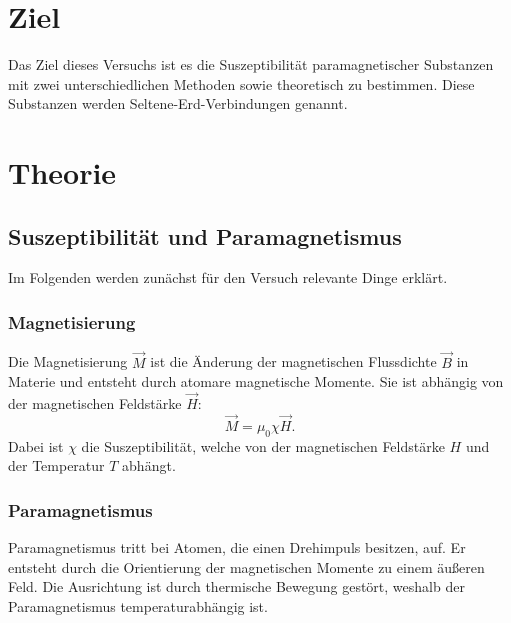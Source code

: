 \section{Ziel}
Das Ziel dieses Versuchs ist es die Suszeptibilität paramagnetischer Substanzen mit
zwei unterschiedlichen Methoden sowie theoretisch zu bestimmen.
Diese Substanzen werden Seltene-Erd-Verbindungen genannt. 

\section{Theorie}
\label{sec:Theorie}


\subsection{Suszeptibilität und Paramagnetismus} %
Im Folgenden werden zunächst für den Versuch relevante Dinge erklärt.

\subsubsection{Magnetisierung}
Die Magnetisierung $\vec{M}$ ist die Änderung der magnetischen Flussdichte $\vec{B}$ %
in Materie und entsteht durch atomare magnetische Momente. %
Sie ist abhängig von der magnetischen Feldstärke $\vec{H}$:
\begin{equation*}
    \vec{M} = \mu_0 \chi \vec{H}.
    \label{eqn:magnetisierung}
\end{equation*}
Dabei ist $\chi$ die Suszeptibilität, welche von der magnetischen Feldstärke $H$ und 
der Temperatur $T$ abhängt. 

\subsubsection{Paramagnetismus}
Paramagnetismus tritt bei Atomen, die einen Drehimpuls besitzen, auf. 
Er entsteht durch die Orientierung der magnetischen Momente zu einem äußeren Feld. 
Die Ausrichtung ist durch thermische Bewegung gestört, weshalb der Paramagnetismus 
temperaturabhängig ist. 

